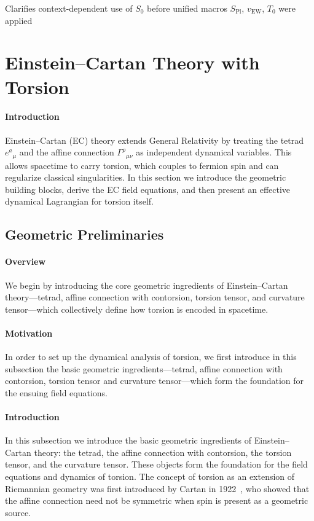 \documentclass{article}
\newcommand{\Splanck}{S_{\mathrm{Pl}}}
\newcommand{\vEW}{v_{\mathrm{EW}}}
\begin{document}
Clarifies context-dependent use of $S_0$ before unified macros $\Splanck$, $\vEW$, $T_0$ were applied









\section{Einstein–Cartan Theory with Torsion}
\label{sec:EC-torsion}

\paragraph{Introduction}
Einstein–Cartan (EC) theory extends General Relativity by treating the tetrad $e^a{}_\mu$ and the affine connection $\Gamma^\rho{}_{\mu\nu}$ as independent dynamical variables.  This allows spacetime to carry torsion, which couples to fermion spin and can regularize classical singularities.  In this section we introduce the geometric building blocks, derive the EC field equations, and then present an effective dynamical Lagrangian for torsion itself.


\subsection{Geometric Preliminaries}

\paragraph{Overview}
We begin by introducing the core geometric ingredients of Einstein–Cartan theory—tetrad, affine connection with contorsion, torsion tensor, and curvature tensor—which collectively define how torsion is encoded in spacetime.


\label{sec:EC-geom}
\paragraph{Motivation}
In order to set up the dynamical analysis of torsion, we first introduce in this subsection the basic geometric ingredients—tetrad, affine connection with contorsion, torsion tensor and curvature tensor—which form the foundation for the ensuing field equations.


\paragraph{Introduction}
In this subsection we introduce the basic geometric ingredients of Einstein–Cartan theory: the tetrad, the affine connection with contorsion, the torsion tensor, and the curvature tensor. These objects form the foundation for the field equations and dynamics of torsion.
The concept of torsion as an extension of Riemannian geometry was first introduced by Cartan in 1922~\cite{cartan1922}, who showed that the affine connection need not be symmetric when spin is present as a geometric source.
\end{document}
